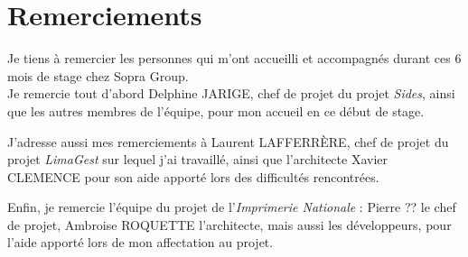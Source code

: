 \cleardoublepage

\chapter*{Remerciements}



Je tiens à remercier les personnes qui m'ont accueilli et accompagnés durant ces 6 mois de stage chez Sopra Group.
\\

Je remercie tout d'abord Delphine JARIGE, chef de projet du projet \textit{Sides}, ainsi que les autres membres de l'équipe, pour mon accueil en ce début de stage.

J'adresse aussi mes remerciements à Laurent LAFFERRÈRE, chef de projet du projet \textit{LimaGest} sur lequel j'ai travaillé, ainsi que l'architecte Xavier CLEMENCE pour son aide apporté lors des difficultés rencontrées.

Enfin, je remercie l'équipe du projet de l'\textit{Imprimerie Nationale} : Pierre ?? le chef de projet, Ambroise ROQUETTE l'architecte, mais aussi les développeurs, pour l'aide apporté lors de mon affectation au projet.